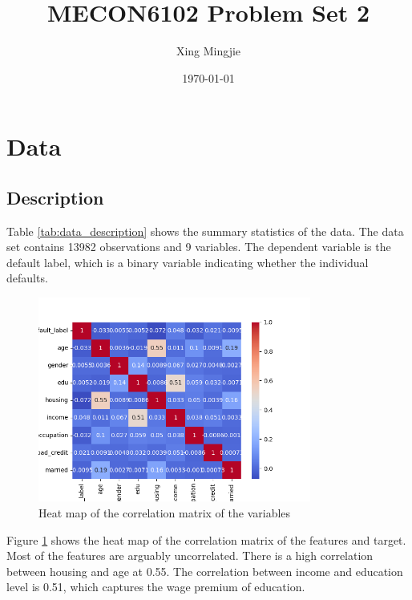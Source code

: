 \documentclass[10pt]{article} %
\title{MECON6102 Problem Set 2}
\author{Xing Mingjie}
\date{\today} %
\begin{document}
\maketitle




\section{Data}
    \subsection{Description}
    

    Table \ref{tab:data_description} shows the summary statistics of the data. The data set contains 13982 observations and 9 variables. The dependent variable is the default label, which is a binary variable indicating whether the individual defaults. 

    \begin{figure}
        \centering
        \includegraphics[width=0.8\textwidth]{"../fig/variable_heatmap.png"}
        \caption{Heat map of the correlation matrix of the variables}
        \label{fig:variable_heatmap}
    \end{figure}
    Figure \ref{fig:variable_heatmap} shows the heat map of the correlation matrix of the features and target. Most of the features are arguably uncorrelated. There is a high correlation between housing and age at 0.55. The correlation between income and education level is 0.51, which captures the wage premium of education.
\end{document}
